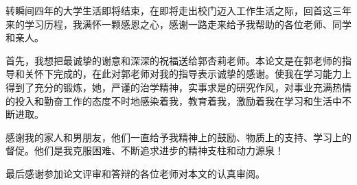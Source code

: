 \documentclass{XDBAthesis}
\begin{document}
\else
\fi
\begin{thanks}
转瞬间四年的大学生活即将结束，在即将走出校门迈入工作生活之际，回首这三年来的学习历程，我满怀一颗感恩之心，感谢一路走来给予我帮助的各位老师、同学和亲人。

首先，我想把最诚挚的谢意和深深的祝福送给郭杏莉老师。本论文是在郭老师的指导和关怀下完成的，在此对郭老师对我的指导表示诚挚的感谢。使我在学习能力上得到了充分的锻炼，她，严谨的治学精神，实事求是的研究作风，对事业充满热情的投入和勤奋工作的态度不时地感染着我，教育着我，激励着我在学习和生活中不断进取。

感谢我的家人和男朋友，他们一直给予我精神上的鼓励、物质上的支持、学习上的督促。他们是我克服困难、不断追求进步的精神支柱和动力源泉！

最后感谢参加论文评审和答辩的各位老师对本文的认真审阅。
\end{thanks}
\ifx\allfiles\undefined
%

\end{document}
